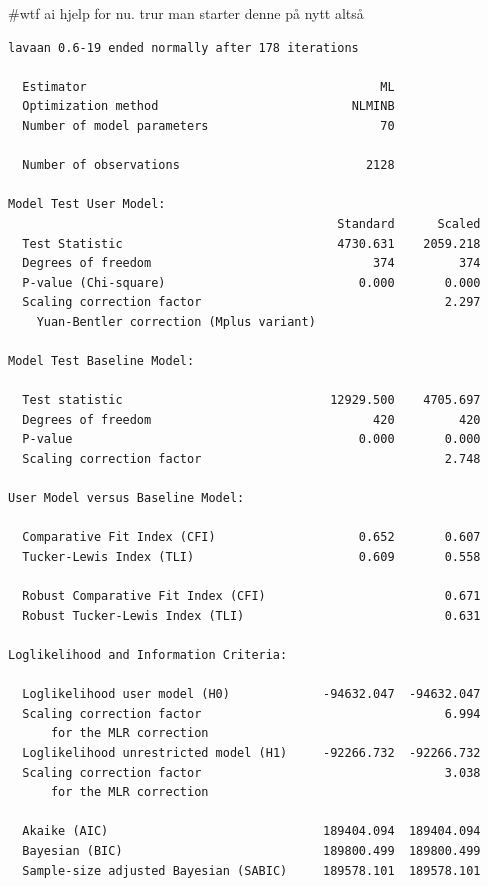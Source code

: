 \documentclass[
  12pt,
  a4paper,
  DIV=11,
  numbers=noendperiod]{scrartcl}
\begin{document}
\#wtf ai hjelp for nu. trur man starter denne på nytt altså

\begin{verbatim}
lavaan 0.6-19 ended normally after 178 iterations

  Estimator                                         ML
  Optimization method                           NLMINB
  Number of model parameters                        70

  Number of observations                          2128

Model Test User Model:
                                              Standard      Scaled
  Test Statistic                              4730.631    2059.218
  Degrees of freedom                               374         374
  P-value (Chi-square)                           0.000       0.000
  Scaling correction factor                                  2.297
    Yuan-Bentler correction (Mplus variant)                       

Model Test Baseline Model:

  Test statistic                             12929.500    4705.697
  Degrees of freedom                               420         420
  P-value                                        0.000       0.000
  Scaling correction factor                                  2.748

User Model versus Baseline Model:

  Comparative Fit Index (CFI)                    0.652       0.607
  Tucker-Lewis Index (TLI)                       0.609       0.558
                                                                  
  Robust Comparative Fit Index (CFI)                         0.671
  Robust Tucker-Lewis Index (TLI)                            0.631

Loglikelihood and Information Criteria:

  Loglikelihood user model (H0)             -94632.047  -94632.047
  Scaling correction factor                                  6.994
      for the MLR correction                                      
  Loglikelihood unrestricted model (H1)     -92266.732  -92266.732
  Scaling correction factor                                  3.038
      for the MLR correction                                      
                                                                  
  Akaike (AIC)                              189404.094  189404.094
  Bayesian (BIC)                            189800.499  189800.499
  Sample-size adjusted Bayesian (SABIC)     189578.101  189578.101


\end{verbatim}
\end{document}
